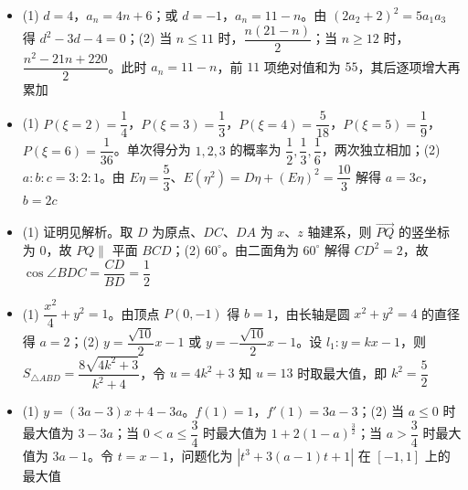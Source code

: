 \begin{itemize}[leftmargin=2.6em]
  \item[\textbf{18.}] (1) $d=4$，$a_n=4n+6$；或 $d=-1$，$a_n=11-n$。由 $(2a_2+2)^2=5a_1a_3$ 得 $d^2-3d-4=0$；(2) 当 $n\leqslant11$ 时，$\dfrac{n(21-n)}2$；当 $n\geqslant12$ 时，$\dfrac{n^2-21n+220}2$。此时 $a_n=11-n$，前 $11$ 项绝对值和为 $55$，其后逐项增大再累加
  \item[\textbf{19.}] (1) $P(\xi=2)=\dfrac14$，$P(\xi=3)=\dfrac13$，$P(\xi=4)=\dfrac5{18}$，$P(\xi=5)=\dfrac19$，$P(\xi=6)=\dfrac1{36}$。单次得分为 $1,2,3$ 的概率为 $\dfrac12,\dfrac13,\dfrac16$，两次独立相加；(2) $a:b:c=3:2:1$。由 $E\eta=\dfrac53$、$E(\eta^2)=D\eta+(E\eta)^2=\dfrac{10}3$ 解得 $a=3c$，$b=2c$
  \item[\textbf{20.}] (1) 证明见解析。取 $D$ 为原点、$DC$、$DA$ 为 $x$、$z$ 轴建系，则 $\overrightarrow{PQ}$ 的竖坐标为 $0$，故 $PQ\parallel$ 平面 $BCD$；(2) $60^\circ$。由二面角为 $60^\circ$ 解得 $CD^2=2$，故 $\cos\angle BDC=\dfrac{CD}{BD}=\dfrac12$
  \item[\textbf{21.}] (1) $\dfrac{x^2}4+y^2=1$。由顶点 $P(0,-1)$ 得 $b=1$，由长轴是圆 $x^2+y^2=4$ 的直径得 $a=2$；(2) $y=\dfrac{\sqrt{10}}2x-1$ 或 $y=-\dfrac{\sqrt{10}}2x-1$。设 $l_1:y=kx-1$，则 $S_{\triangle ABD}=\dfrac{8\sqrt{4k^2+3}}{k^2+4}$，令 $u=4k^2+3$ 知 $u=13$ 时取最大值，即 $k^2=\dfrac52$
  \item[\textbf{22.}] (1) $y=(3a-3)x+4-3a$。$f(1)=1$，$f'(1)=3a-3$；(2) 当 $a\leqslant0$ 时最大值为 $3-3a$；当 $0<a\leqslant\dfrac34$ 时最大值为 $1+2(1-a)^{\frac32}$；当 $a>\dfrac34$ 时最大值为 $3a-1$。令 $t=x-1$，问题化为 $\left|t^3+3(a-1)t+1\right|$ 在 $[-1,1]$ 上的最大值
\end{itemize}
